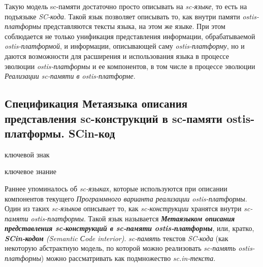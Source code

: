 Такую модель sc-памяти достаточно просто описывать на \textit{sc-языке}, то есть на подъязыке \textit{SC-кода}. Такой язык позволяет описывать то, как внутри памяти \textit{ostis-платформы} представляются тексты языка, на этом же языке. При этом соблюдается не только унификация представления информации, обрабатываемой \textit{ostis-платформой}, и информации, описывающей саму \textit{ostis-платформу}, но и даются возможности для расширения и использования языка в процессе эволюции \textit{ostis-платформы} и ее компонентов, в том числе в процессе эволюции \textit{Реализации sc-памяти в ostis-платформе}.

\subsection{Спецификация Метаязыка описания представления sc-конструкций в sc-памяти ostis-платформы. SCin-код}
\label{sec_soft_platform_scin_code}

\begin{SCn}

\begin{scnrelfromlist}{ключевой знак}
	\begin{scnindent}
	\end{scnindent}
\end{scnrelfromlist}
	
\begin{scnrelfromlist}{ключевое знание}
\end{scnrelfromlist}	
	
\end{SCn}

Раннее упоминалось об \textit{sc-языках}, которые используются при описании компонентов текущего \textit{Программного варианта реализации ostis-платформы}. Один из таких \textit{sc-языков} описывает то, как \textit{sc-конструкции} хранятся внутри \textit{sc-памяти ostis-платформы}. Такой язык называется \textbf{\textit{Метаязыком описания представления sc-конструкций в sc-памяти ostis-платформы}}, или, кратко, \textit{\textbf{SCin-кодом} (Semantic Сode interior)}. \textit{sc-память} текстов \textit{SC-кода} (как некоторую абстрактную модель, по которой можно реализовать \textit{sc-память ostis-платформы}) можно рассматривать как подмножество \textit{sc.in-текста}.

